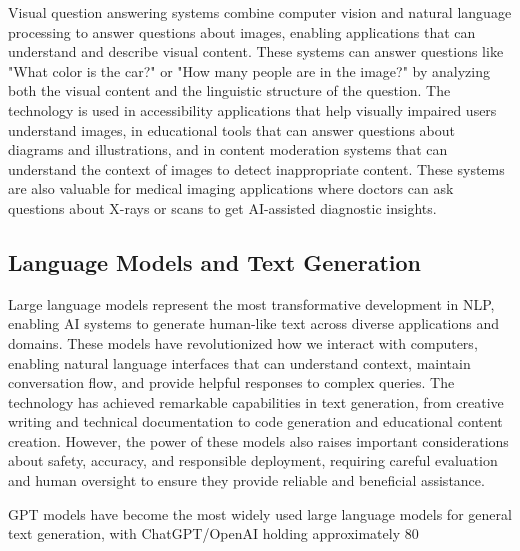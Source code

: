 Visual question answering systems combine computer vision and natural language processing to answer questions about images, enabling applications that can understand and describe visual content. These systems can answer questions like "What color is the car?" or "How many people are in the image?" by analyzing both the visual content and the linguistic structure of the question. The technology is used in accessibility applications that help visually impaired users understand images, in educational tools that can answer questions about diagrams and illustrations, and in content moderation systems that can understand the context of images to detect inappropriate content. These systems are also valuable for medical imaging applications where doctors can ask questions about X-rays or scans to get AI-assisted diagnostic insights.

\subsection{Language Models and Text Generation}

Large language models represent the most transformative development in NLP, enabling AI systems to generate human-like text across diverse applications and domains. These models have revolutionized how we interact with computers, enabling natural language interfaces that can understand context, maintain conversation flow, and provide helpful responses to complex queries. The technology has achieved remarkable capabilities in text generation, from creative writing and technical documentation to code generation and educational content creation. However, the power of these models also raises important considerations about safety, accuracy, and responsible deployment, requiring careful evaluation and human oversight to ensure they provide reliable and beneficial assistance.

GPT models have become the most widely used large language models for general text generation, with ChatGPT/OpenAI holding approximately 80%

